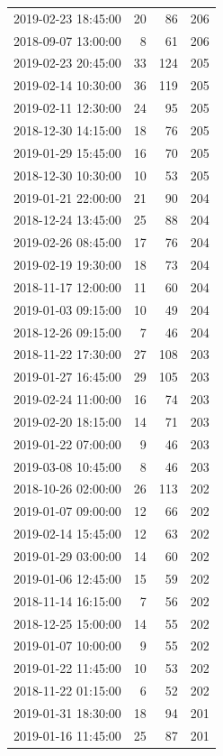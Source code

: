 \begin{tabular}{lrrr}
2019-02-23 18:45:00 & 20 & 86 & 206 \\
2018-09-07 13:00:00 & 8 & 61 & 206 \\
2019-02-23 20:45:00 & 33 & 124 & 205 \\
2019-02-14 10:30:00 & 36 & 119 & 205 \\
2019-02-11 12:30:00 & 24 & 95 & 205 \\
2018-12-30 14:15:00 & 18 & 76 & 205 \\
2019-01-29 15:45:00 & 16 & 70 & 205 \\
2018-12-30 10:30:00 & 10 & 53 & 205 \\
2019-01-21 22:00:00 & 21 & 90 & 204 \\
2018-12-24 13:45:00 & 25 & 88 & 204 \\
2019-02-26 08:45:00 & 17 & 76 & 204 \\
2019-02-19 19:30:00 & 18 & 73 & 204 \\
2018-11-17 12:00:00 & 11 & 60 & 204 \\
2019-01-03 09:15:00 & 10 & 49 & 204 \\
2018-12-26 09:15:00 & 7 & 46 & 204 \\
2018-11-22 17:30:00 & 27 & 108 & 203 \\
2019-01-27 16:45:00 & 29 & 105 & 203 \\
2019-02-24 11:00:00 & 16 & 74 & 203 \\
2019-02-20 18:15:00 & 14 & 71 & 203 \\
2019-01-22 07:00:00 & 9 & 46 & 203 \\
2019-03-08 10:45:00 & 8 & 46 & 203 \\
2018-10-26 02:00:00 & 26 & 113 & 202 \\
2019-01-07 09:00:00 & 12 & 66 & 202 \\
2019-02-14 15:45:00 & 12 & 63 & 202 \\
2019-01-29 03:00:00 & 14 & 60 & 202 \\
2019-01-06 12:45:00 & 15 & 59 & 202 \\
2018-11-14 16:15:00 & 7 & 56 & 202 \\
2018-12-25 15:00:00 & 14 & 55 & 202 \\
2019-01-07 10:00:00 & 9 & 55 & 202 \\
2019-01-22 11:45:00 & 10 & 53 & 202 \\
2018-11-22 01:15:00 & 6 & 52 & 202 \\
2019-01-31 18:30:00 & 18 & 94 & 201 \\
2019-01-16 11:45:00 & 25 & 87 & 201 \\

\end{tabular}
